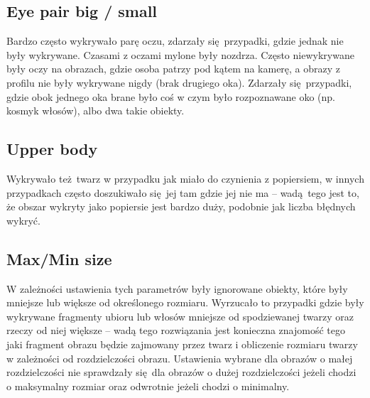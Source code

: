 \documentclass[a4paper, 12pt, titlepage]{article}
\begin{document}
        \subsection{Eye pair big / small}
            Bardzo często wykrywało parę oczu, zdarzały się przypadki, gdzie
            jednak nie były wykrywane. Czasami z oczami mylone były nozdrza.
            Często niewykrywane były oczy na obrazach, gdzie osoba patrzy pod
            kątem na kamerę, a obrazy z profilu nie były wykrywane nigdy (brak
            drugiego oka). Zdarzały się przypadki, gdzie obok jednego oka brane
            było coś w czym było rozpoznawane oko (np. kosmyk włosów), albo
            dwa takie obiekty.
        \subsection{Upper body}
            Wykrywało też twarz w przypadku jak miało do czynienia z popiersiem,
            w innych przypadkach często doszukiwało się jej tam gdzie jej nie ma
            -- wadą tego jest to, że obszar wykryty jako popiersie jest bardzo
            duży, podobnie jak liczba błędnych wykryć.
        \subsection{Max/Min size}
            W zależności ustawienia tych parametrów były ignorowane obiekty,
            które były mniejsze lub większe od określonego rozmiaru. Wyrzucało
            to przypadki gdzie były wykrywane fragmenty ubioru lub włosów
            mniejsze od spodziewanej twarzy oraz rzeczy od niej większe -- wadą
            tego rozwiązania jest konieczna znajomość tego jaki fragment obrazu
            będzie zajmowany przez twarz i obliczenie rozmiaru twarzy w 
            zależności od rozdzielczości obrazu. Ustawienia wybrane dla obrazów
            o małej rozdzielczości nie sprawdzały się dla obrazów o dużej
            rozdzielczości jeżeli chodzi o maksymalny rozmiar oraz odwrotnie
            jeżeli chodzi o minimalny.
\end{document}
